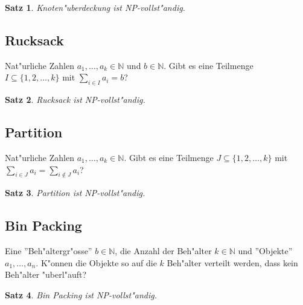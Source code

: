 \documentclass[german, 10pt, a4paper, twocolumn]{scrartcl}
\newtheorem{satz}{Satz}[section]
\theoremstyle{definition}
\theoremstyle{example}
\begin{document}
\begin{satz}
	Knoten"uberdeckung ist NP-vollst"andig.
\end{satz}

\subsection{Rucksack}

Nat"urliche Zahlen $a_1,\ldots, a_k \in \mathbb{N}$ und $b\in \mathbb{N}$. Gibt es eine Teilmenge $I \subseteq \{1,2,\ldots,k  \}$ mit $\sum_{i\in I} a_i =b$?

\begin{satz}
	Rucksack ist NP-vollst"andig.
\end{satz}

\subsection{Partition}

Nat"urliche Zahlen $a_1,\ldots, a_k \in \mathbb{N}$. Gibt es eine Teilmenge $J \subseteq \{ 1,2,\ldots, k \}$ mit $\sum_{i \in J} a_i = \sum_{i\not\in J} a_i$?

\begin{satz}
	Partition ist NP-vollst"andig.
\end{satz}

\subsection{Bin Packing}

Eine ''Beh"altergr"osse'' $b\in \mathbb{N}$, die Anzahl der Beh"alter $k\in \mathbb{N}$ und ''Objekte'' $a_1,\ldots, a_n$. K"onnen die Objekte so auf die $k$ Beh"alter verteilt werden, dass kein Beh"alter "uberl"auft?

\begin{satz}
	Bin Packing ist NP-vollst"andig.
\end{satz}
\end{document}
